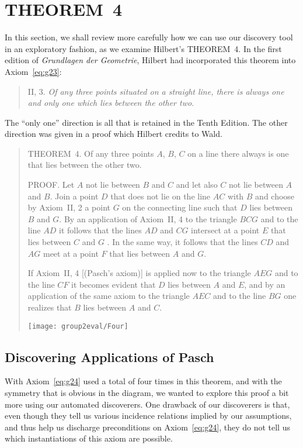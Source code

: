 \section{THEOREM~4}
In this section, we shall review more carefully how we can use our discovery tool in an exploratory fashion, as we examine Hilbert's THEOREM~4. In the first edition of \emph{Grundlagen der Geometrie}, Hilbert had incorporated this theorem into Axiom~\ref{eq:g23}:
\begin{quotation}
  II, 3. \emph{Of any three points situated on a straight line, there is always one and only one which lies between the other two.}
\end{quotation}

The ``only one'' direction is all that is retained in the Tenth Edition. The other direction was given in a proof which Hilbert credits to Wald.
\begin{quotation}
  THEOREM~4. Of any three points $A$, $B$, $C$ on a line there always is one that lies between the other two.

  PROOF. Let $A$ not lie between $B$ and $C$ and let also $C$ not lie between $A$ and $B$. Join a point $D$ that does not lie on the line $AC$ with $B$ and choose by Axiom~II, 2 a point $G$ on the connecting line such that $D$ lies between $B$ and $G$. By an application of Axiom~II, 4 to the triangle $BCG$ and to the line $AD$ it follows that the lines $AD$ and $CG$ intersect at a point $E$ that lies between $C$ and $G$ . In the same way, it follows that the lines $CD$ and $AG$ meet at a point $F$ that lies between $A$ and $G$.

If Axiom~II, 4 [(Pasch's axiom)] is applied now to the triangle $AEG$ and to the line $CF$ it becomes evident that $D$ lies between $A$ and $E$, and by an application of the same axiom to the triangle $AEC$ and to the line $BG$ one realizes that $B$ lies between $A$ and $C$.

\centering \texttt{[image: group2eval/Four]}
\end{quotation}

\subsection{Discovering Applications of Pasch}\label{sec:PaschDiscoverer}
With Axiom~\ref{eq:g24} used a total of four times in this theorem, and with the symmetry that is obvious in the diagram, we wanted to explore this proof a bit more using our automated discoverers. One drawback of our discoverers is that, even though they tell us various incidence relations implied by our assumptions, and thus help us discharge preconditions on Axiom~\ref{eq:g24}, they do not tell us which instantiations of this axiom are possible.

